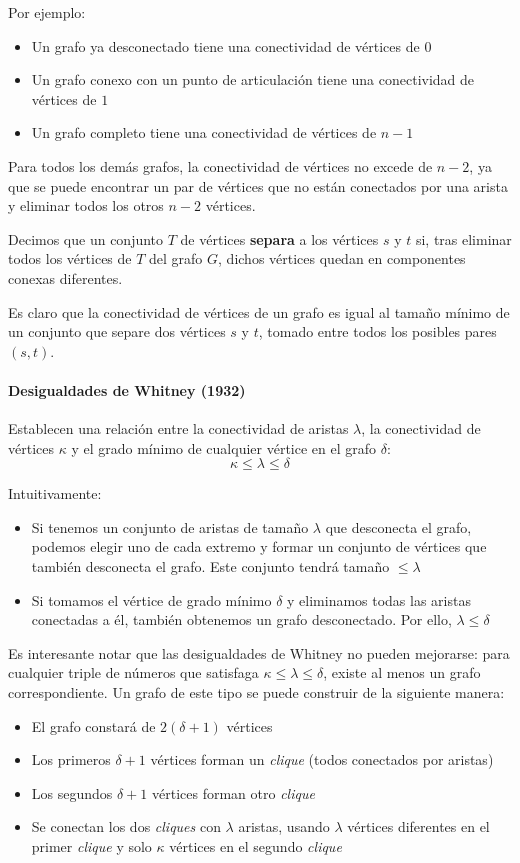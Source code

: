 \documentclass[a4paper]{article}
\begin{document}
Por ejemplo:
\begin{itemize}
    \item Un grafo ya desconectado tiene una conectividad de vértices de \(0\)
    \item Un grafo conexo con un punto de articulación tiene una conectividad de vértices de \(1\)
    \item Un grafo completo tiene una conectividad de vértices de \(n-1\)
\end{itemize}

Para todos los demás grafos, la conectividad de vértices no excede de \(n-2\), ya que se puede encontrar un par de vértices que no están conectados por una arista y eliminar todos los otros \(n-2\) vértices.

Decimos que un conjunto \(T\) de vértices \textbf{separa} a los vértices \(s\) y \(t\) si, tras eliminar todos los vértices de \(T\) del grafo \(G\), dichos vértices quedan en componentes conexas diferentes.

Es claro que la conectividad de vértices de un grafo es igual al tamaño mínimo de un conjunto que separe dos vértices \(s\) y \(t\), tomado entre todos los posibles pares \((s, t)\).

\paragraph{Desigualdades de Whitney (1932)}
Establecen una relación entre la conectividad de aristas \(\lambda\), la conectividad de vértices \(\kappa\) y el grado mínimo de cualquier vértice en el grafo \(\delta\):
\[
\kappa \leq \lambda \leq \delta
\]

Intuitivamente:
\begin{itemize}
    \item Si tenemos un conjunto de aristas de tamaño \(\lambda\) que desconecta el grafo, podemos elegir uno de cada extremo y formar un conjunto de vértices que también desconecta el grafo. Este conjunto tendrá tamaño \(\leq \lambda\)
    \item Si tomamos el vértice de grado mínimo \(\delta\) y eliminamos todas las aristas conectadas a él, también obtenemos un grafo desconectado. Por ello, \(\lambda \leq \delta\)
\end{itemize}

Es interesante notar que las desigualdades de Whitney no pueden mejorarse: para cualquier triple de números que satisfaga \(\kappa \leq \lambda \leq \delta\), existe al menos un grafo correspondiente. Un grafo de este tipo se puede construir de la siguiente manera:
\begin{itemize}
    \item El grafo constará de \(2(\delta + 1)\) vértices
    \item Los primeros \(\delta + 1\) vértices forman un \textit{clique} (todos conectados por aristas)
    \item Los segundos \(\delta + 1\) vértices forman otro \textit{clique}
    \item Se conectan los dos \textit{cliques} con \(\lambda\) aristas, usando \(\lambda\) vértices diferentes en el primer \textit{clique} y solo \(\kappa\) vértices en el segundo \textit{clique}
\end{itemize}
\end{document}
